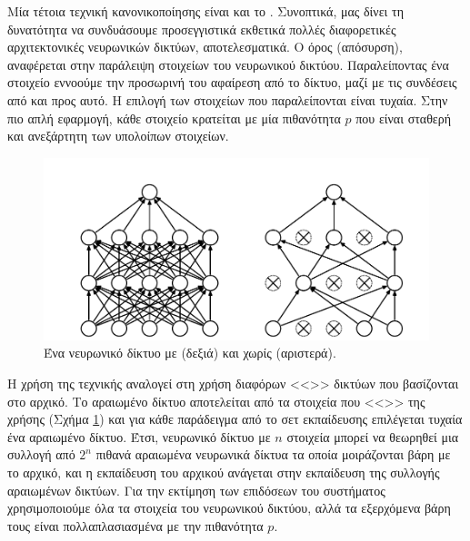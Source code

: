 Μία τέτοια τεχνική κανονικοποίησης είναι και το  \cite{Srivastava2014}.
Συνοπτικά, μας δίνει τη δυνατότητα να συνδυάσουμε προσεγγιστικά εκθετικά πολλές διαφορετικές αρχιτεκτονικές νευρωνικών δικτύων, αποτελεσματικά.
Ο όρος  (απόσυρση), αναφέρεται στην παράλειψη στοιχείων του νευρωνικού δικτύου.
Παραλείποντας ένα στοιχείο εννοούμε την προσωρινή του αφαίρεση από το δίκτυο, μαζί με τις συνδέσεις από και προς αυτό.
Η επιλογή των στοιχείων που παραλείπονται είναι τυχαία.
Στην πιο απλή εφαρμογή, κάθε στοιχείο κρατείται με μία πιθανότητα $p$ που είναι σταθερή και ανεξάρτητη των υπολοίπων στοιχείων.

\begin{figure}
	\includegraphics[width=\textwidth, keepaspectratio]{images/dropout.png}
	\centering 
	\caption{Ένα νευρωνικό δίκτυο με  (δεξιά) και χωρίς (αριστερά).}
	\label{fig:dropout}
\end{figure}

Η χρήση της τεχνικής  αναλογεί στη χρήση διαφόρων <<>> δικτύων που βασίζονται στο αρχικό.
Το αραιωμένο δίκτυο αποτελείται από τα στοιχεία που <<>> της χρήσης  (Σχήμα \ref{fig:dropout}) και για κάθε παράδειγμα από το σετ εκπαίδευσης επιλέγεται τυχαία ένα αραιωμένο δίκτυο.
Έτσι, νευρωνικό δίκτυο με $n$ στοιχεία μπορεί να θεωρηθεί μια συλλογή από $2^n$ πιθανά αραιωμένα νευρωνικά δίκτυα τα οποία μοιράζονται βάρη με το αρχικό, και η εκπαίδευση του αρχικού ανάγεται στην εκπαίδευση της συλλογής αραιωμένων δικτύων. 
Για την εκτίμηση των επιδόσεων του συστήματος χρησιμοποιούμε όλα τα στοιχεία του νευρωνικού δικτύου, αλλά τα εξερχόμενα βάρη τους είναι πολλαπλασιασμένα με την πιθανότητα $p$.